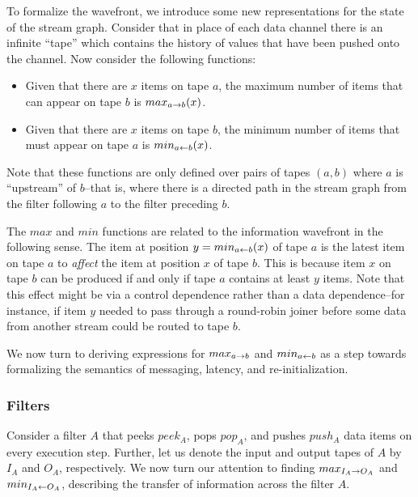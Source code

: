 To formalize the wavefront, we introduce some new representations for
the state of the stream graph.  Consider that in place of each data
channel there is an infinite ``tape'' which contains the history of
values that have been pushed onto the channel.  Now consider the
following functions:

\begin{itemize}

\item Given that there are $x$ items on tape $a$, the maximum number
of items that can appear on tape $b$ is $max_{a \rightarrow b}(x)$.

\item Given that there are $x$ items on tape $b$, the minimum number
of items that must appear on tape $a$ is $min_{a \leftarrow b}(x)$.

\end{itemize}

Note that these functions are only defined over pairs of tapes $(a,
b)$ where $a$ is ``upstream'' of $b$--that is, where there is a
directed path in the stream graph from the filter following $a$ to the
filter preceding $b$.

The $max$ and $min$ functions are related to the information wavefront
in the following sense.  The item at position $y = min_{a \leftarrow b}(x)$ of
tape $a$ is the latest item on tape $a$ to {\it affect} the item at
position $x$ of tape $b$.  This is because item $x$ on tape $b$ can be
produced if and only if tape $a$ contains at least $y$ items.  Note
that this effect might be via a control dependence rather than a data
dependence--for instance, if item $y$ needed to pass through a
round-robin joiner before some data from another stream could be
routed to tape $b$.

We now turn to deriving expressions for $max_{a \rightarrow b}$ and $min_{a \leftarrow b}$ as
a step towards formalizing the semantics of messaging, latency, and
re-initialization.

\subsubsection{Filters}

Consider a filter $A$ that peeks $peek_A$, pops $pop_A$, and pushes
$push_A$ data items on every execution step.  Further, let us denote
the input and output tapes of $A$ by $I_A$ and $O_A$, respectively.
We now turn our attention to finding $max_{I_A \rightarrow O_A}$ and
$min_{I_A \leftarrow O_A}$, describing the transfer of information across the
filter $A$.

